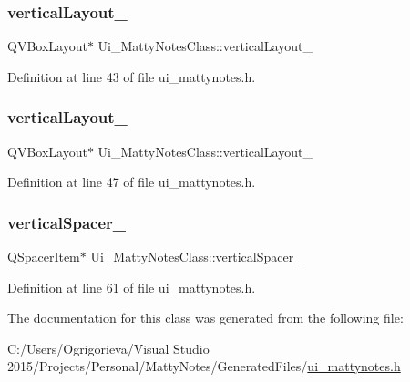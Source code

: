 \hypertarget{classUi__MattyNotesClass_a93592607728a9455d5914a0a6a3c8307}{}\label{classUi__MattyNotesClass_a93592607728a9455d5914a0a6a3c8307} 
\subsubsection{\texorpdfstring{vertical\+Layout\+\_}{verticalLayout\_4}}
{\footnotesize\ttfamily Q\+V\+Box\+Layout$\ast$ Ui\+\_\+\+Matty\+Notes\+Class\+::vertical\+Layout\+\_}



Definition at line 43 of file ui\+\_\+mattynotes.\+h.

\hypertarget{classUi__MattyNotesClass_acc25665c3a621df2d59fcc3586cc4f16}{}\label{classUi__MattyNotesClass_acc25665c3a621df2d59fcc3586cc4f16} 
\subsubsection{\texorpdfstring{vertical\+Layout\+\_}{verticalLayout\_5}}
{\footnotesize\ttfamily Q\+V\+Box\+Layout$\ast$ Ui\+\_\+\+Matty\+Notes\+Class\+::vertical\+Layout\+\_}



Definition at line 47 of file ui\+\_\+mattynotes.\+h.

\hypertarget{classUi__MattyNotesClass_a51e58a329011bb7ae0564f78fb22ad97}{}\label{classUi__MattyNotesClass_a51e58a329011bb7ae0564f78fb22ad97} 
\subsubsection{\texorpdfstring{vertical\+Spacer\+\_}{verticalSpacer\_3}}
{\footnotesize\ttfamily Q\+Spacer\+Item$\ast$ Ui\+\_\+\+Matty\+Notes\+Class\+::vertical\+Spacer\+\_}



Definition at line 61 of file ui\+\_\+mattynotes.\+h.



The documentation for this class was generated from the following file\+:\begin{DoxyCompactItemize}
\item 
C\+:/\+Users/\+Ogrigorieva/\+Visual Studio 2015/\+Projects/\+Personal/\+Matty\+Notes/\+Generated\+Files/\hyperlink{ui__mattynotes_8h}{ui\+\_\+mattynotes.\+h}\end{DoxyCompactItemize}
